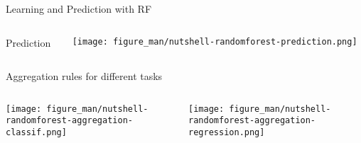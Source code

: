 \documentclass[11pt,compress,t,notes=noshow, xcolor=table]{beamer}
\begin{document}
\begin{vbframe}{Learning and Prediction with RF}
\begin{columns}
\begin{column}{0.05\textwidth} 
\begin{center}
\vspace{0.7cm}
Prediction
\end{center}
\end{column}
\begin{column}{0.95\textwidth} 
\begin{center}
  \texttt{[image: figure\_man/nutshell-randomforest-prediction.png]} 
\end{center}
\end{column}
\end{columns}

\end{vbframe} 


\begin{vbframe}{Aggregation rules for different tasks}
\begin{columns}  
\begin{column}{0.5\textwidth} 
\begin{center}
 \texttt{[image: figure\_man/nutshell-randomforest-aggregation-classif.png]}
 \end{center}
\end{column}
\begin{column}{0.5\textwidth} 
\begin{center}
  \texttt{[image: figure\_man/nutshell-randomforest-aggregation-regression.png]}
\end{center}
\end{column}
\end{columns}



\end{vbframe}

\end{document}
